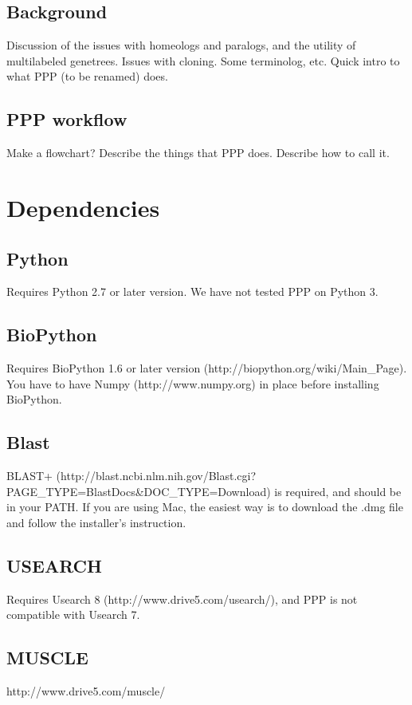 \documentclass[12pt,letterpaper]{article}
\begin{document}
\subsection{Background} 
Discussion of the issues with homeologs and paralogs, and the utility of 
multilabeled genetrees. Issues with cloning. Some terminolog, etc.
Quick intro to what PPP (to be renamed) does.

\subsection{PPP workflow}
Make a flowchart? Describe the things that PPP does.
Describe how to call it.

\bigskip\section{Dependencies} %
\subsection{Python}
Requires Python 2.7 or later version. We have not tested PPP on Python 3. 

\subsection{BioPython}
Requires BioPython 1.6 or later version (http://biopython.org/wiki/Main_Page). You have to have Numpy (http://www.numpy.org) in place before installing BioPython. 

\subsection{Blast}
BLAST+ (http://blast.ncbi.nlm.nih.gov/Blast.cgi?PAGE_TYPE=BlastDocs&DOC_TYPE=Download) is required, and should be in your PATH. If you are using Mac, the easiest way is to download the .dmg file and follow the installer's instruction.  

\subsection{USEARCH}
Requires Usearch 8 (http://www.drive5.com/usearch/), and PPP is not compatible with Usearch 7.

\subsection{MUSCLE}
http://www.drive5.com/muscle/
\end{document}
